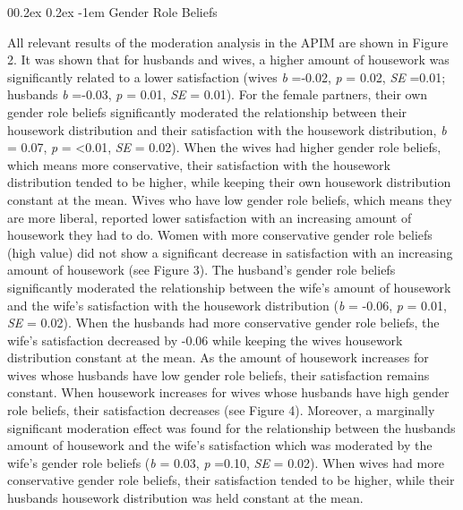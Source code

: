 \documentclass[
  man,floatsintext]{apa6}
\makeatletter
\let\oldparagraph\paragraph
\renewcommand{\paragraph}[1]{\oldparagraph{#1}\mbox{}}
\renewcommand{\paragraph}{\@startsection{paragraph}{4}{\parindent}%
  {0\baselineskip \@plus 0.2ex \@minus 0.2ex}%
  {-1em}%
  {\normalfont\normalsize\bfseries\itshape\typesectitle}}
\makeatother
\begin{document}
\hypertarget{gender-role-beliefs-1}{%
\paragraph{Gender Role Beliefs}\label{gender-role-beliefs-1}}

All relevant results of the moderation analysis in the APIM are shown in Figure 2. It was shown that for husbands and wives, a higher amount of housework was significantly related to a lower satisfaction (wives \emph{b} =-0.02, \emph{p} = 0.02, \emph{SE} =0.01; husbands \emph{b} =-0.03, \emph{p} = 0.01, \emph{SE} = 0.01).
For the female partners, their own gender role beliefs significantly moderated the relationship between their housework distribution and their satisfaction with the housework distribution, \emph{b} = 0.07, \emph{p} = \textless0.01, \emph{SE} = 0.02). When the wives had higher gender role beliefs, which means more conservative, their satisfaction with the housework distribution tended to be higher, while keeping their own housework distribution constant at the mean. Wives who have low gender role beliefs, which means they are more liberal, reported lower satisfaction with an increasing amount of housework they had to do. Women with more conservative gender role beliefs (high value) did not show a significant decrease in satisfaction with an increasing amount of housework (see Figure 3).
The husband's gender role beliefs significantly moderated the relationship between the wife's amount of housework and the wife's satisfaction with the housework distribution (\emph{b} = -0.06, \emph{p} = 0.01, \emph{SE} = 0.02). When the husbands had more conservative gender role beliefs, the wife's satisfaction decreased by -0.06 while keeping the wives housework distribution constant at the mean.
As the amount of housework increases for wives whose husbands have low gender role beliefs, their satisfaction remains constant. When housework increases for wives whose husbands have high gender role beliefs, their satisfaction decreases (see Figure 4).
Moreover, a marginally significant moderation effect was found for the relationship between the husbands amount of housework and the wife's satisfaction which was moderated by the wife's gender role beliefs (\emph{b} = 0.03, \emph{p} =0.10, \emph{SE} = 0.02). When wives had more conservative gender role beliefs, their satisfaction tended to be higher, while their husbands housework distribution was held constant at the mean.
\end{document}
